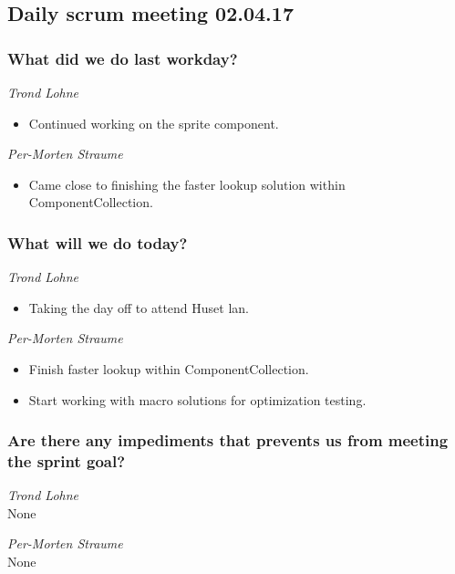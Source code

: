 \documentclass{article}
\begin{document}
\begin{center}
\subsection*{Daily scrum meeting 02.04.17}
\end{center}
\bigskip


\subsubsection*{What did we do last workday?}

\noindent\textit{Trond Lohne}
\begin{itemize}
	\item
	Continued working on the sprite component.
\end{itemize}

\medskip

\noindent\textit{Per-Morten Straume}
\begin{itemize}
	\item
	Came close to finishing the faster lookup solution within ComponentCollection.
\end{itemize}


\subsubsection*{What will we do today?}

\noindent\textit{Trond Lohne}
\begin{itemize}
	\item
	Taking the day off to attend Huset lan.
\end{itemize}

\medskip

\noindent\textit{Per-Morten Straume}
\begin{itemize}
	\item
	Finish faster lookup within ComponentCollection.

	\item
	Start working with macro solutions for optimization testing.
\end{itemize}


\subsubsection*{Are there any impediments that prevents us from meeting the sprint goal?}

\noindent\textit{Trond Lohne}\\
None

\medskip

\noindent\textit{Per-Morten Straume}\\
None
\end{document}
